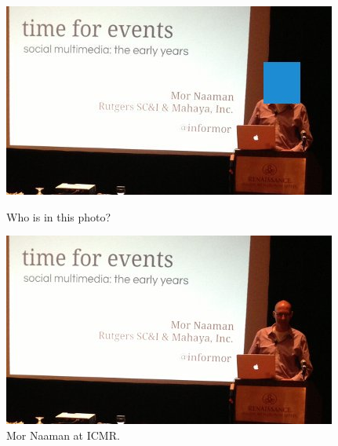 \begin{figure}[ht]
\begin{minipage}[b]{0.45\linewidth}
\centering
\includegraphics[width=\textwidth]{media/chapter1/icmr-keynote-2-hidden.jpg}
\caption{Who is in this photo?}
\label{fig:example-icmr-hidden}
\end{minipage}
\hspace{0.5cm}
\begin{minipage}[b]{0.45\linewidth}
\centering
\includegraphics[width=\textwidth]{media/chapter1/icmr-keynote-2-show.jpg}
\caption{Mor Naaman at ICMR.}
\label{fig:example-icmr-show}
\end{minipage}
\end{figure}

\pagebreak

